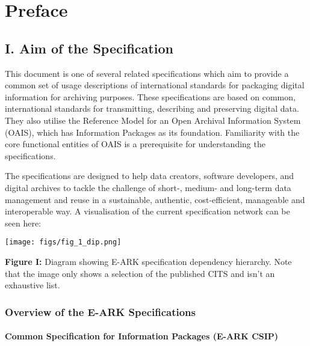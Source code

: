 \hypertarget{preface}{%
\section*{Preface}\label{preface}}

\hypertarget{i-aim-of-the-specification}{%
\subsection*{I. Aim of the
Specification}\label{i-aim-of-the-specification}}

This document is one of several related specifications which aim to
provide a common set of usage descriptions of international standards
for packaging digital information for archiving purposes. These
specifications are based on common, international standards for
transmitting, describing and preserving digital data. They also utilise
the Reference Model for an Open Archival Information System (OAIS),
which has Information Packages as its foundation. Familiarity with the
core functional entities of OAIS is a prerequisite for understanding the
specifications.

The specifications are designed to help data creators, software
developers, and digital archives to tackle the challenge of short-,
medium- and long-term data management and reuse in a sustainable,
authentic, cost-efficient, manageable and interoperable way. A
visualisation of the current specification network can be seen here:

\texttt{[image: figs/fig\_1\_dip.png]}

\textbf{Figure I:} Diagram showing E-ARK specification dependency
hierarchy. Note that the image only shows a selection of the published
CITS and isn't an exhaustive list.

\hypertarget{overview-of-the-e-ark-specifications}{%
\subsubsection*{Overview of the E-ARK
Specifications}\label{overview-of-the-e-ark-specifications}}

\hypertarget{common-specification-for-information-packages-e-ark-csip}{%
\paragraph{Common Specification for Information Packages (E-ARK
CSIP)}\label{common-specification-for-information-packages-e-ark-csip}}

